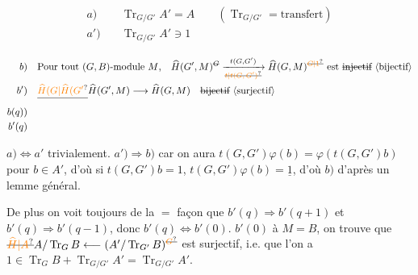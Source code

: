 \[\begin{aligned}
a)\quad &\operatorname{Tr}_{G/G'} A'=A \qquad(\operatorname{Tr}_{G/G'}=\text{transfert})\\
a')\quad &\operatorname{Tr}_{G/G'} A'\ni1
\end{aligned}\]

\[\begin{aligned}
b)\quad &\text{Pour tout $(G,B)$-module $M$,}\quad \widehat H(G',M)^{\deleted{G}}\xrightarrow[\deleted{\unsure{t|t(G,G')}}]{t(G,G')}\widehat H(G,M)^{\deleted{\unsure{G|1}}}\ \text{est \deleted{injectif} \inserted{bijectif}}\\
b')\quad &\deleted{\unsure{\widehat H(G|\widehat H(G'}}\widehat H(G',M)\longrightarrow\widehat H(G,M)\quad\text{\deleted{bijectif} \inserted{surjectif}}\\
b(q))\quad &\\ b'(q)\quad &
\end{aligned}\]

$a)\Leftrightarrow a'$ trivialement. $a')\Rightarrow b)$ car on aura $t(G,G')\varphi(b)=\varphi(t(G,G')b)$ pour $b\in A'$, d'où si $t(G,G')b=1$, $t(G,G')\varphi(b)=\underline{1}$, d'où $b)$ d'après un lemme général.



De plus on voit toujours de la $=$ façon que $b'(q)\Rightarrow b'(q+1)$ et $b'(q)\Rightarrow b'(q-1)$, donc $b'(q)\Leftrightarrow b'(0)$.  $b'(0)$ à $M=B$, on trouve que $\deleted{\unsure{\widehat H|A}} A/\operatorname{Tr}_G B\longleftarrow(A'/\operatorname{Tr}_{G'} B)^{\deleted{\unsure{G}}}$ est surjectif, i.e. que l'on a $1\in\operatorname{Tr}_G B+\operatorname{Tr}_{G/G'}A'=\operatorname{Tr}_{G/G'} A'$.

